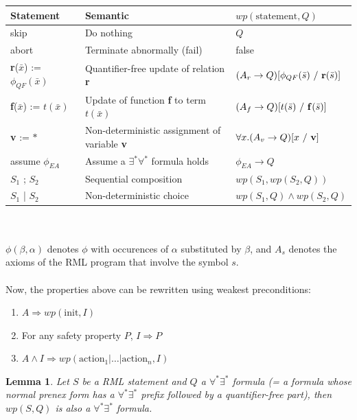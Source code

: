 \documentclass[11pt,a4paper,oldfontcommands,openany]{memoir}
\newtheorem*{lemma}{Lemma}
\begin{document}
    \begin{tabular}{|l|l|l|}
        \hline
        Statement & Semantic & \( wp(\text{statement},Q) \) \\
        \hline
        skip & Do nothing & \(Q\) \\
        abort & Terminate abnormally (fail) & false \\
        \textbf{r}(\(\bar{x}\)) := \( \phi_{QF}(\bar{x}) \) & Quantifier-free update of relation \textbf{r} & \((A_r \rightarrow Q) [\phi_{QF}(\bar{s})\ /\ \text{\textbf{r}}(\bar{s})]\) \\
        \textbf{f}(\(\bar{x}\)) := \( t(\bar{x}) \) & Update of function \textbf{f} to term \( t(\bar{x}) \) & \((A_f \rightarrow Q) [t(\bar{s})\ /\ \text{\textbf{f}}(\bar{s})]\) \\
        \textbf{v} := \( * \) & Non-deterministic assignment of variable \textbf{v} & \(\forall x. (A_v \rightarrow Q) [x\ /\ \text{\textbf{v}}]\)\\
        assume \( \phi_{EA} \) & Assume a \( \exists^*\forall^* \) formula holds & \( \phi_{EA} \rightarrow Q \) \\
        \( S_1 \) ; \( S_2 \) & Sequential composition & \( wp(S_1, wp(S_2, Q)) \) \\
        \( S_1 \) | \( S_2 \) & Non-deterministic choice & \( wp(S_1, Q) \land wp(S_2, Q) \) \\
        \hline
    \end{tabular}\\ \\
    \( \phi(\beta,\alpha) \) denotes \(\phi\) with occurences of \(\alpha\) substituted by \(\beta\), and \(A_s\) denotes the axioms of the RML program
    that involve the symbol \(s\).\\
    \\
    Now, the properties above can be rewritten using weakest preconditions:
    \begin{enumerate}
        \item \(A \Rightarrow wp(\text{init},I)\)
        \item For any safety property \(P\), \(I \Rightarrow P\)
        \item \(A \land I \Rightarrow wp(\text{action}_1|\ldots|\text{action}_n,I)\)
    \end{enumerate}

    \begin{lemma}
        Let \(S\) be a RML statement and \(Q\) a \(\forall^*\exists^*\) formula (= a formula whose normal prenex form has a \(\forall^*\exists^*\) prefix followed by a quantifier-free part), then \(wp(S,Q)\) is also a \(\forall^*\exists^*\) formula.
    \end{lemma}
\end{document}
